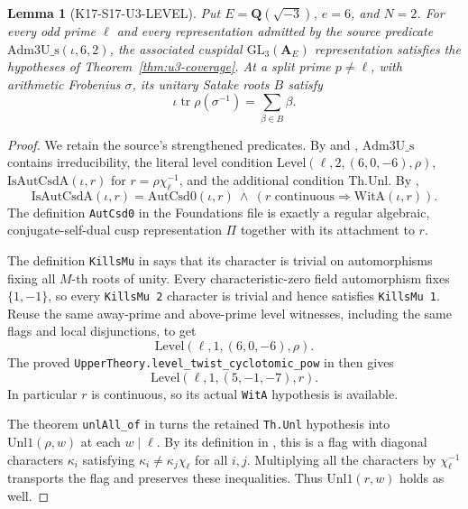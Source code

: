 \documentclass[11pt,a4paper]{article}
\newtheorem{lemma}[theorem]{Lemma}
\theoremstyle{definition}
\begin{document}
\begin{lemma}[K17-S17-U3-LEVEL]\label{lem:step17-u3-level}
Put $E=\mathbf Q(\sqrt{-3})$, $e=6$, and $N=2$.
For every odd prime $\ell$ and every representation admitted by the
source predicate $\mathrm{Adm3U\_s}(\iota,6,2)$, the associated cuspidal
$\mathrm{GL}_3(\mathbf A_E)$ representation satisfies the hypotheses of
Theorem~\ref{thm:u3-coverage}. At a split prime $p\ne\ell$, with arithmetic
Frobenius $\sigma$, its unitary Satake roots $B$ satisfy
\[
 \iota\operatorname{tr}\rho(\sigma^{-1})=\sum_{\beta\in B}\beta.
\]
\end{lemma}

\begin{proof}
We retain the source's strengthened predicates. By
 and ,
$\mathrm{Adm3U\_s}$ contains irreducibility, the literal level condition
$\mathrm{Level}(\ell,2,(6,0,-6),\rho)$,
$\mathrm{IsAutCsdA}(\iota,r)$ for $r=\rho\chi_\ell^{-1}$,
and the additional condition $\mathrm{Th.Unl}$.
By ,
\[
 \mathrm{IsAutCsdA}(\iota,r)=
 \mathrm{AutCsd0}(\iota,r)\ \wedge\
 (r\text{ continuous}\Rightarrow\mathrm{WitA}(\iota,r)).
\]
The definition \texttt{AutCsd0} in the Foundations file
is exactly a regular algebraic, conjugate-self-dual cusp representation
$\Pi$ together with its attachment to $r$.

The definition \texttt{KillsMu} in
says that its character is trivial on automorphisms fixing all $M$-th
roots of unity. Every characteristic-zero field automorphism fixes
$\{1,-1\}$, so every \texttt{KillsMu 2} character is trivial and hence
satisfies \texttt{KillsMu 1}. Reuse the same away-prime and above-prime
level witnesses, including the same flags and local disjunctions, to get
\[
 \mathrm{Level}(\ell,1,(6,0,-6),\rho).
\]
The proved \texttt{UpperTheory.level\_twist\_cyclotomic\_pow}
in 
then gives
\[
 \mathrm{Level}(\ell,1,(5,-1,-7),r).
\]
In particular $r$ is continuous, so its actual \texttt{WitA} hypothesis
is available.

The theorem \texttt{unlAll\_of} in
turns the retained \texttt{Th.Unl} hypothesis into
$\mathrm{Unl1}(\rho,w)$ at each $w\mid\ell$.
By its definition in , this is a
flag with diagonal characters $\kappa_i$ satisfying
$\kappa_i\ne\kappa_j\chi_\ell$ for all $i,j$.
Multiplying all the characters by $\chi_\ell^{-1}$ transports the flag
and preserves these inequalities. Thus $\mathrm{Unl1}(r,w)$ holds as well.


\end{proof}
\end{document}
